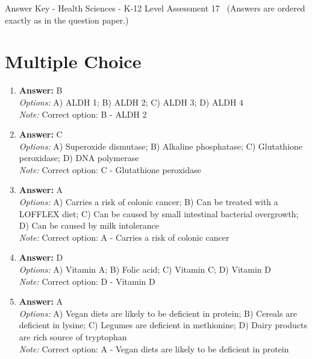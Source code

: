 \documentclass[12pt]{article}
\begin{document}
\begin{center}
Answer Key - Health Sciences - K-12 Level Assessment 17 \
\small (Answers are ordered exactly as in the question paper.)
\end{center}

\section*{Multiple Choice}
\begin{enumerate}[label=\arabic*.]
\item \textbf{Answer:} B
\\ \textit{Options:} A) ALDH 1; B) ALDH 2; C) ALDH 3; D) ALDH 4
\\ \textit{Note:} Correct option: B - ALDH 2
\item \textbf{Answer:} C
\\ \textit{Options:} A) Superoxide dismutase; B) Alkaline phosphatase; C) Glutathione peroxidase; D) DNA polymerase
\\ \textit{Note:} Correct option: C - Glutathione peroxidase
\item \textbf{Answer:} A
\\ \textit{Options:} A) Carries a risk of colonic cancer; B) Can be treated with a LOFFLEX diet; C) Can be caused by small intestinal bacterial overgrowth; D) Can be caused by milk intolerance
\\ \textit{Note:} Correct option: A - Carries a risk of colonic cancer
\item \textbf{Answer:} D
\\ \textit{Options:} A) Vitamin A; B) Folic acid; C) Vitamin C; D) Vitamin D
\\ \textit{Note:} Correct option: D - Vitamin D
\item \textbf{Answer:} A
\\ \textit{Options:} A) Vegan diets are likely to be deficient in protein; B) Cereals are deficient in lysine; C) Legumes are deficient in methionine; D) Dairy products are rich source of tryptophan
\\ \textit{Note:} Correct option: A - Vegan diets are likely to be deficient in protein
\end{enumerate}
\end{document}
